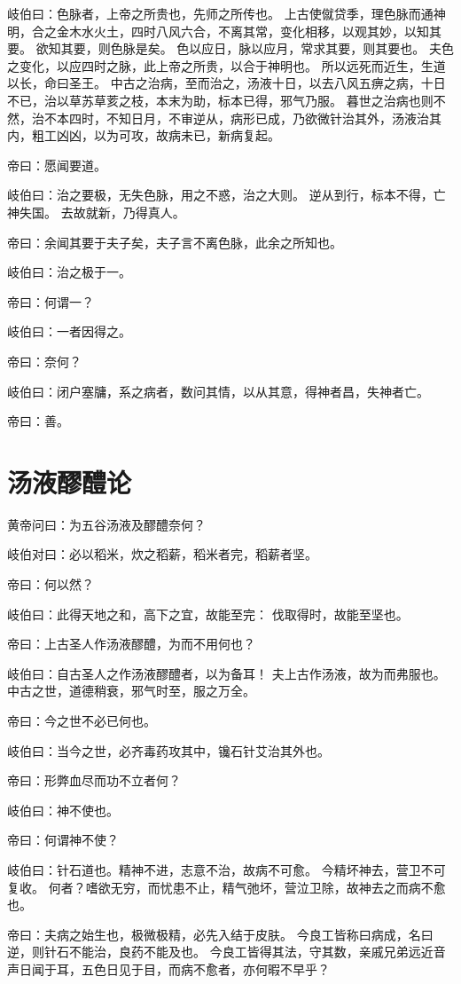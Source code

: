 \documentclass{article}%
\begin{document}
岐伯曰：色脉者，上帝之所贵也，先师之所传也。
上古使僦贷季，理色脉而通神明，合之金木水火土，四时八风六合，不离其常，变化相移，以观其妙，以知其要。
欲知其要，则色脉是矣。
色以应日，脉以应月，常求其要，则其要也。
夫色之变化，以应四时之脉，此上帝之所贵，以合于神明也。
所以远死而近生，生道以长，命曰圣王。
中古之治病，至而治之，汤液十日，以去八风五痹之病，十日不已，治以草苏草荄之枝，本末为助，标本已得，邪气乃服。
暮世之治病也则不然，治不本四时，不知日月，不审逆从，病形已成，乃欲微针治其外，汤液治其内，粗工凶凶，以为可攻，故病未已，新病复起。

帝曰：愿闻要道。

岐伯曰：治之要极，无失色脉，用之不惑，治之大则。
逆从到行，标本不得，亡神失国。
去故就新，乃得真人。

帝曰：余闻其要于夫子矣，夫子言不离色脉，此余之所知也。

岐伯曰：治之极于一。

帝曰：何谓一？

岐伯曰：一者因得之。

帝曰：奈何？

岐伯曰：闭户塞牗，系之病者，数问其情，以从其意，得神者昌，失神者亡。

帝曰：善。


\section{汤液醪醴论}
黄帝问曰：为五谷汤液及醪醴奈何？

岐伯对曰：必以稻米，炊之稻薪，稻米者完，稻薪者坚。

帝曰：何以然？

岐伯曰：此得天地之和，高下之宜，故能至完：
伐取得时，故能至坚也。

帝曰：上古圣人作汤液醪醴，为而不用何也？

岐伯曰：自古圣人之作汤液醪醴者，以为备耳！
夫上古作汤液，故为而弗服也。中古之世，道德稍衰，邪气时至，服之万全。

帝曰：今之世不必已何也。

岐伯曰：当今之世，必齐毒药攻其中，镵石针艾治其外也。

帝曰：形弊血尽而功不立者何？

岐伯曰：神不使也。

帝曰：何谓神不使？

岐伯曰：针石道也。精神不进，志意不治，故病不可愈。
今精坏神去，营卫不可复收。
何者？嗜欲无穷，而忧患不止，精气弛坏，营泣卫除，故神去之而病不愈也。

帝曰：夫病之始生也，极微极精，必先入结于皮肤。
今良工皆称曰病成，名曰逆，则针石不能治，良药不能及也。
今良工皆得其法，守其数，亲戚兄弟远近音声日闻于耳，五色日见于目，而病不愈者，亦何暇不早乎？
\end{document}
